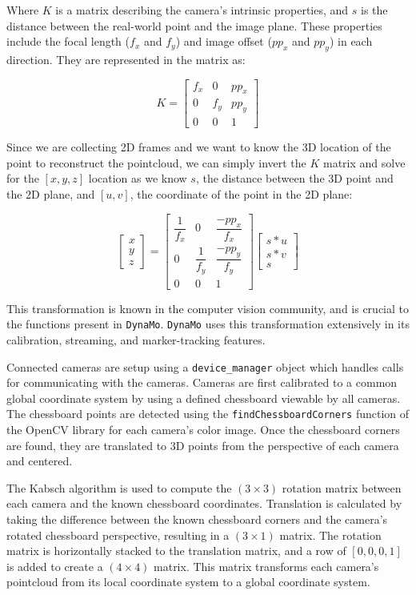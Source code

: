 \documentclass[defaultstyle,11pt]{comps}
\begin{document}
Where \(K\) is a matrix describing the camera's intrinsic properties, and \(s\) is the distance between the real-world point and the image plane.
These properties include the focal length (\(f_{x}\) and \(f_{y}\)) and image offset (\(pp_{x}\) and \(pp_{y}\)) in each direction.
They are represented in the matrix as:

\[
K=\begin{bmatrix}f_{x}&0&pp_{x}\\0&f_{y}&pp_{y}\\0&0&1\end{bmatrix}
\]

Since we are collecting 2D frames and we want to know the 3D location of the point to reconstruct the pointcloud, we can simply invert the \(K\) matrix and solve for the \([x,y,z]\) location as we know \(s\), the distance between the 3D point and the 2D plane, and \([u,v]\), the coordinate of the point in the 2D plane:

\[
\begin{bmatrix}x\\y\\z\end{bmatrix}=\begin{bmatrix}\dfrac{1}{f_{x}}&0&\dfrac{-pp_{x}}{f_{x}}\\0&\dfrac{1}{f_{y}}&\dfrac{-pp_{y}}{f_{y}}\\0&0&1\end{bmatrix}\begin{bmatrix}s*u\\s*v\\s\end{bmatrix}
\]

This transformation is known in the computer vision community, and is crucial to the functions present in \texttt{DynaMo}.
\texttt{DynaMo} uses this transformation extensively in its calibration, streaming, and marker-tracking features.

Connected cameras are setup using a \texttt{device\_manager} object which handles calls for communicating with the cameras.
Cameras are first calibrated to a common global coordinate system by using a defined chessboard viewable by all cameras.
The chessboard points are detected using the \texttt{findChessboardCorners} function of the OpenCV library \citep{opencv_library} for each camera's color image.
Once the chessboard corners are found, they are translated to 3D points from the perspective of each camera and centered.

The Kabsch algorithm \citep{Kabsch1976} is used to compute the \((3\times3)\) rotation matrix between each camera and the known chessboard coordinates.
Translation is calculated by taking the difference between the known chessboard corners and the camera's rotated chessboard perspective, resulting in a \((3\times1)\) matrix.
The rotation matrix is horizontally stacked to the translation matrix, and a row of \([0,0,0,1]\) is added to create a \((4\times4)\) matrix.
This matrix transforms each camera's pointcloud from its local coordinate system to a global coordinate system.
\end{document}
